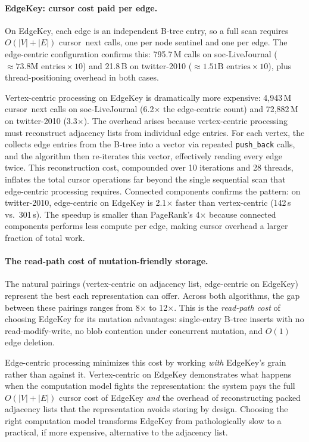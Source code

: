 \paragraph{EdgeKey: cursor cost paid per edge.}
On EdgeKey, each edge is an independent B-tree entry, so a full scan requires $O(|V| + |E|)$ cursor~next calls, one per node sentinel and one per edge.
The edge-centric configuration confirms this: 795.7\,M calls on soc-LiveJournal ($\approx 73.8\text{M entries} \times 10$) and 21.8\,B on twitter-2010 ($\approx 1.51\text{B entries} \times 10$), plus thread-positioning overhead in both cases.

Vertex-centric processing on EdgeKey is dramatically more expensive: 4{,}943\,M cursor~next calls on soc-LiveJournal (6.2$\times$ the edge-centric count) and 72{,}882\,M on twitter-2010 (3.3$\times$).
The overhead arises because vertex-centric processing must reconstruct adjacency lists from individual edge entries.
For each vertex, the  collects edge entries from the B-tree into a vector via repeated \texttt{push\_back} calls, and the algorithm then re-iterates this vector, effectively reading every edge twice.
This reconstruction cost, compounded over 10 iterations and 28 threads, inflates the total cursor operations far beyond the single sequential scan that edge-centric processing requires.
Connected components confirms the pattern: on twitter-2010, edge-centric on EdgeKey is 2.1$\times$ faster than vertex-centric (142\,s vs.\ 301\,s).
The speedup is smaller than PageRank's 4$\times$ because connected components performs less compute per edge, making cursor overhead a larger fraction of total work.

\paragraph{The read-path cost of mutation-friendly storage.}
The natural pairings (vertex-centric on adjacency list, edge-centric on EdgeKey) represent the best each representation can offer.
Across both algorithms, the gap between these pairings ranges from 8$\times$ to 12$\times$.
This is the \emph{read-path cost} of choosing EdgeKey for its mutation advantages: single-entry B-tree inserts with no read-modify-write, no blob contention under concurrent mutation, and $O(1)$ edge deletion.

Edge-centric processing minimizes this cost by working \emph{with} EdgeKey's grain rather than against it.
Vertex-centric on EdgeKey demonstrates what happens when the computation model fights the representation: the system pays the full $O(|V| + |E|)$ cursor cost of EdgeKey \emph{and} the overhead of reconstructing packed adjacency lists that the representation avoids storing by design.
Choosing the right computation model transforms EdgeKey from pathologically slow to a practical, if more expensive, alternative to the adjacency list.


